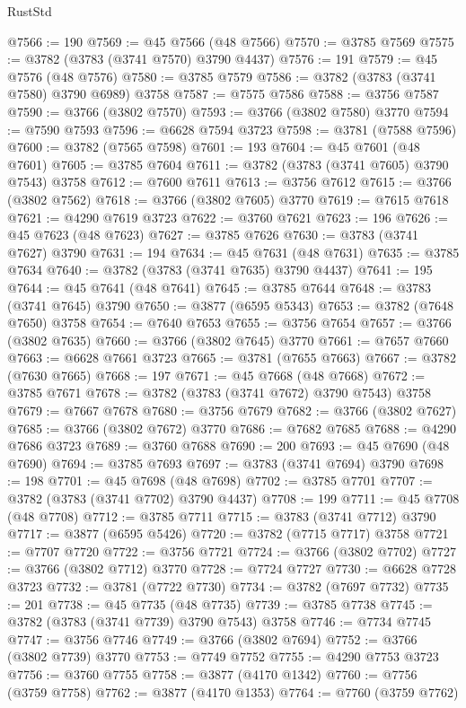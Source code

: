 \begin{lexlean}{RustStd}
\begin{coremodule}
@7566 := 190
@7569 := @45 @7566 (@48 @7566)
@7570 := @3785 @7569
@7575 := @3782 (@3783 (@3741 @7570) @3790 @4437)
@7576 := 191
@7579 := @45 @7576 (@48 @7576)
@7580 := @3785 @7579
@7586 := @3782 (@3783 (@3741 @7580) @3790 @6989) @3758
@7587 := @7575 @7586
@7588 := @3756 @7587
@7590 := @3766 (@3802 @7570)
@7593 := @3766 (@3802 @7580) @3770
@7594 := @7590 @7593
@7596 := @6628 @7594 @3723
@7598 := @3781 (@7588 @7596)
@7600 := @3782 (@7565 @7598)
@7601 := 193
@7604 := @45 @7601 (@48 @7601)
@7605 := @3785 @7604
@7611 := @3782 (@3783 (@3741 @7605) @3790 @7543) @3758
@7612 := @7600 @7611
@7613 := @3756 @7612
@7615 := @3766 (@3802 @7562)
@7618 := @3766 (@3802 @7605) @3770
@7619 := @7615 @7618
@7621 := @4290 @7619 @3723
@7622 := @3760 @7621
@7623 := 196
@7626 := @45 @7623 (@48 @7623)
@7627 := @3785 @7626
@7630 := @3783 (@3741 @7627) @3790
@7631 := 194
@7634 := @45 @7631 (@48 @7631)
@7635 := @3785 @7634
@7640 := @3782 (@3783 (@3741 @7635) @3790 @4437)
@7641 := 195
@7644 := @45 @7641 (@48 @7641)
@7645 := @3785 @7644
@7648 := @3783 (@3741 @7645) @3790
@7650 := @3877 (@6595 @5343)
@7653 := @3782 (@7648 @7650) @3758
@7654 := @7640 @7653
@7655 := @3756 @7654
@7657 := @3766 (@3802 @7635)
@7660 := @3766 (@3802 @7645) @3770
@7661 := @7657 @7660
@7663 := @6628 @7661 @3723
@7665 := @3781 (@7655 @7663)
@7667 := @3782 (@7630 @7665)
@7668 := 197
@7671 := @45 @7668 (@48 @7668)
@7672 := @3785 @7671
@7678 := @3782 (@3783 (@3741 @7672) @3790 @7543) @3758
@7679 := @7667 @7678
@7680 := @3756 @7679
@7682 := @3766 (@3802 @7627)
@7685 := @3766 (@3802 @7672) @3770
@7686 := @7682 @7685
@7688 := @4290 @7686 @3723
@7689 := @3760 @7688
@7690 := 200
@7693 := @45 @7690 (@48 @7690)
@7694 := @3785 @7693
@7697 := @3783 (@3741 @7694) @3790
@7698 := 198
@7701 := @45 @7698 (@48 @7698)
@7702 := @3785 @7701
@7707 := @3782 (@3783 (@3741 @7702) @3790 @4437)
@7708 := 199
@7711 := @45 @7708 (@48 @7708)
@7712 := @3785 @7711
@7715 := @3783 (@3741 @7712) @3790
@7717 := @3877 (@6595 @5426)
@7720 := @3782 (@7715 @7717) @3758
@7721 := @7707 @7720
@7722 := @3756 @7721
@7724 := @3766 (@3802 @7702)
@7727 := @3766 (@3802 @7712) @3770
@7728 := @7724 @7727
@7730 := @6628 @7728 @3723
@7732 := @3781 (@7722 @7730)
@7734 := @3782 (@7697 @7732)
@7735 := 201
@7738 := @45 @7735 (@48 @7735)
@7739 := @3785 @7738
@7745 := @3782 (@3783 (@3741 @7739) @3790 @7543) @3758
@7746 := @7734 @7745
@7747 := @3756 @7746
@7749 := @3766 (@3802 @7694)
@7752 := @3766 (@3802 @7739) @3770
@7753 := @7749 @7752
@7755 := @4290 @7753 @3723
@7756 := @3760 @7755
@7758 := @3877 (@4170 @1342)
@7760 := @7756 (@3759 @7758)
@7762 := @3877 (@4170 @1353)
@7764 := @7760 (@3759 @7762)

\end{coremodule}
\end{lexlean}
